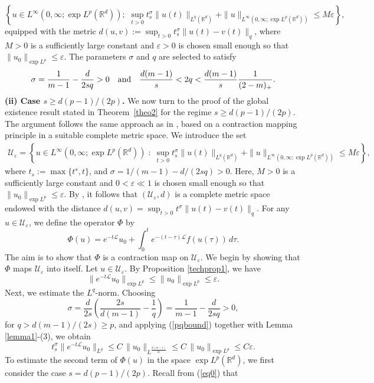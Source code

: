 \documentclass[a4paper,11pt]{amsart}
\renewcommand\eqref[1]{(\ref{#1})} %
\numberwithin{equation}{section}
\theoremstyle{plain}
\theoremstyle{definition}
\begin{document}
$$\left\{u\in L^\infty(0,\infty;\exp L^p(\mathbb{R}^d));\,\,\sup_{t>0}t_s^\sigma\|u(t)\|_{L^q(\mathbb{R}^d)}+\|u\|_{L^\infty(0,\infty;\exp L^p(\mathbb{R}^d))}\leq M\varepsilon\right\},$$
equipped with the metric $d(u,v):=\sup_{t>0}t_s^\sigma\|u(t)-v(t)\|_{q}$, where $M>0$ is a sufficiently large constant and $\varepsilon>0$ is chosen small enough so that $\|u_0\|_{\exp L^p}\leq\varepsilon$. The parameters $\sigma$ and $q$ are selected to satisfy 
$$ \sigma=\frac{1}{m-1}-\frac{d}{2s q}>0\quad\hbox{and}\quad\frac{d(m-1)}{s}<2q<\frac{d(m-1)}{s}\frac{1}{(2-m)_+}.$$
\noindent\textbf{(ii) Case $s \geq d(p-1)/(2p)$.} 
\label{subsec4.2} We now turn to the proof of the global existence result stated in Theorem~\ref{theo2} for the regime $s \ge d(p-1)/(2p)$. The argument follows the same approach as in \cite{FK20,Majdoub2}, based on a contraction mapping principle in a suitable complete metric space. We introduce the set
\begin{eqnarray*}
\mathcal{U}_\varepsilon =
\left\{
u \in L^\infty(0,\infty;\exp L^p(\mathbb{R}^d))
\;:\;
\sup_{t>0} t_s^\sigma \|u(t)\|_{L^q(\mathbb{R}^d)}
+
\|u\|_{L^\infty(0,\infty;\exp L^p(\mathbb{R}^d))}
\le M\varepsilon
\right\},
\end{eqnarray*}
where $t_s:=\max\{t^s,t\}$, and $\sigma=1/(m-1) - d/(2s q)>0$. Here, $M>0$ is a sufficiently large constant and $0<\varepsilon\ll1$ is chosen small enough so that
$
\|u_0\|_{\exp L^p}
\le \varepsilon.
$
By \cite[Proposition~2.2]{Majdoub2}, 
it follows that $(\mathcal{U}_\varepsilon, d)$ is a complete metric space endowed with the distance $
d(u,v)
=
\sup_{t>0}
t^\sigma
\|u(t)-v(t)\|_{q}.
$
For any $u \in \mathcal{U}_\varepsilon$, we define the  operator $\Phi$ by
\[
\Phi(u)
=
e^{-t\mathcal{L}}u_0
+
\int_0^t e^{-(t-\tau)\mathcal{L}} f(u(\tau))\, d\tau.
\]
The aim  is to show that $\Phi$ is a contraction map on $\mathcal{U}_\varepsilon$. We begin by showing that $\Phi$ maps $\mathcal{U}_\varepsilon$ into itself. Let $u\in \mathcal{U}_\varepsilon$. By Proposition \ref{techprop1}, we have
$$\|e^{-t\mathcal{L}}u_0\|_{\exp L^p}\leq \|u_0\|_{\exp L^p}\leq\varepsilon.$$
Next, we estimate the $L^q$-norm. Choosing
 $$\sigma=\frac{d}{2 s}\left(\frac{2 s}{d(m-1)}-\frac{1}{q}\right)=\frac{1}{m-1}-\frac{d}{2 s q}>0,$$
for $q>d(m-1)/(2s)\geq p$, and applying \eqref{pqbound} together with Lemma \ref{lemma1}-(3), we obtain
$$
t_s^\sigma\|e^{-t\mathcal{L}}u_0\|_{L^q}\leq C\,\|u_0\|_{L^{\frac{d(m-1)}{2 s}}}\leq C\,\|u_0\|_{\exp L^p}\leq C\varepsilon.
$$
To estimate the second term of $\Phi(u)$ in the space $\exp L^p(\mathbb{R}^d)$, we first consider the case $s=d(p-1)/(2 p)$. Recall from (\ref{eq0}) that
\end{document}
